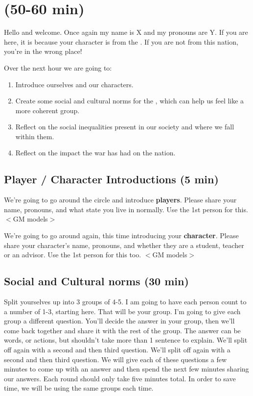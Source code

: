 \documentclass[green]{GL2020}
\begin{document}
\name{\gPreGameFPF{}}

\section*{(50-60 min)}

Hello and welcome. Once again my name is X and my pronouns are Y. If you are here, it is because your character is from the \pTech{}. If you are not from this nation, you're in the wrong place!

Over the next hour we are going to:
\begin{enumerate}
	\item Introduce ourselves and our characters.
	\item Create some social and cultural norms for the \pTech{}, which can help us feel like a more coherent group.
	\item Reflect on the social inequalities present in our society and where we fall within them.
	\item Reflect on the impact the war has had on the nation.
\end{enumerate}

\subsection*{Player / Character Introductions (5 min)}
We’re going to go around the circle and introduce \textbf{players}. Please share your name, pronouns, and what state you live in normally. Use the 1st person for this. $<$GM models$>$

We’re going to go around again, this time introducing your \textbf{character}. Please share your character’s name, pronouns, and whether they are a student, teacher or an advisor. Use the 1st person for this too. $<$GM models$>$

\subsection*{Social and Cultural norms (30 min)}
Split yourselves up into 3 groups of 4-5. I am going to have each person count to a number of 1-3, starting here.  That will be your group.  I’m going to give each group a different question. You’ll decide the answer in your group, then we’ll come back together and share it with the rest of the group. The answer can be words, or actions, but shouldn't take more than 1 sentence to explain. We’ll split off again with a second and then third question. We’ll split off again with a second and then third question. We will give each of these questions a few minutes to come up with an answer and then spend the next few minutes sharing our answers.  Each round should only take five minutes total. In order to save time, we will be using the same groups each time.  
\end{document}

